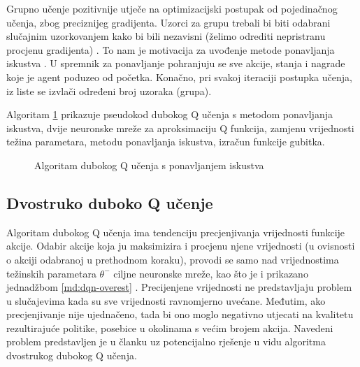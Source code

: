 \bigskip

Grupno  učenje pozitivnije utječe na optimizacijski postupak od pojedinačnog učenja, zbog preciznijeg gradijenta. Uzorci za grupu trebali bi biti odabrani slučajnim uzorkovanjem kako bi bili nezavisni (želimo odrediti nepristranu procjenu gradijenta) \cite{DubuceFer}. To nam je motivacija za uvođenje metode ponavljanja iskustva . U spremnik za ponavljanje  pohranjuju se sve akcije, stanja i nagrade koje je agent poduzeo od početka. Konačno, pri svakoj iteraciji postupka učenja, iz liste se izvlači određeni broj uzoraka (grupa).

Algoritam \ref{fig:dql-algorithm} prikazuje pseudokod dubokog Q učenja s metodom ponavljanja iskustva, dvije neuronske mreže za aproksimaciju Q funkcija, zamjenu vrijednosti težina parametara, metodu ponavljanja iskustva, izračun funkcije gubitka. 

\begin{figure}[H]
    \centering
    \caption{Algoritam dubokog Q učenja s ponavljanjem iskustva \cite{DQL}}
    \label{fig:dql-algorithm}
\end{figure}

\subsection{Dvostruko duboko Q učenje}

Algoritam dubokog Q učenja ima tendenciju precjenjivanja vrijednosti funkcije akcije. Odabir akcije koja ju maksimizira i procjenu njene vrijednosti (u ovisnosti o akciji odabranoj u prethodnom koraku), provodi se samo nad vrijednostima težinskih parametara $\theta^-$ ciljne neuronske mreže, kao što je i prikazano jednadžbom \ref{md:dqn-overest} \cite{DQN-impl}. Precijenjene vrijednosti ne predstavljaju problem u slučajevima kada su sve vrijednosti ravnomjerno uvećane. Međutim, ako precjenjivanje nije ujednačeno, tada bi ono moglo negativno utjecati na kvalitetu rezultirajuće politike, posebice u okolinama s većim brojem akcija. Navedeni problem predstavljen je u članku \cite{DDQL} uz potencijalno rješenje u vidu algoritma dvostrukog dubokog Q učenja.

